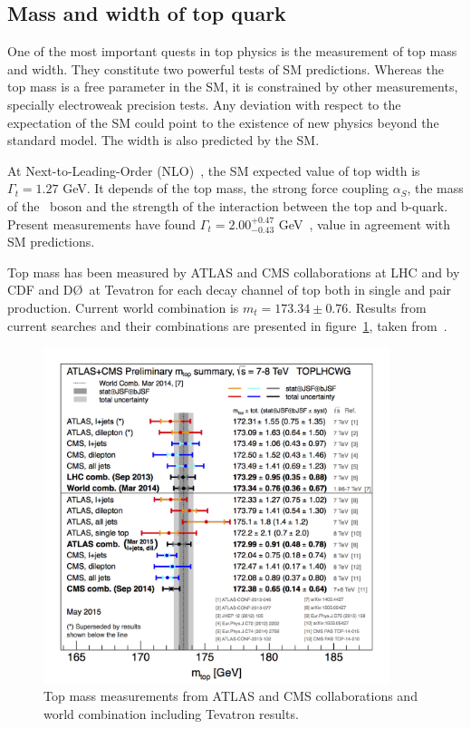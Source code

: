 \subsection{Mass and width of top quark}

One of the most important quests in top physics is the measurement of top mass and width. They constitute two powerful tests of SM predictions. Whereas the top mass is a free parameter in the SM, it is constrained by other measurements, specially electroweak precision tests. Any deviation with respect to the expectation of the SM could point to the existence of new physics beyond the standard model. The width is also predicted by the SM.%

At Next-to-Leading-Order (NLO)~\cite{Jezabek19891}, the SM expected value of top width is $\Gamma_{t}=1.27$ GeV. It depends of the top mass, the strong force coupling $\alpha_{S}$, the mass of the \W~boson and the strength of the interaction between the top and b-quark. Present measurements have found $\Gamma_{t}=2.00^{+0.47}_{-0.43}$ GeV~\cite{Abazov:2012vd}, value in agreement with SM predictions. 

Top mass has been measured by ATLAS and CMS collaborations at LHC and by CDF and D\O~at Tevatron for each decay channel of top both in single and pair production. Current world combination is $m_{t}=173.34\pm 0.76$. Results from current searches and their combinations are presented in figure~\ref{fig:TopMass}, taken from~\cite{TOPLHCWG}. 

\begin{figure}[!Hhtbp]
  \begin{center}
    \includegraphics[width=0.9\textwidth]{figs/LHC_topmass_May2015.png}
    \caption{Top mass measurements from ATLAS and CMS collaborations and world combination including Tevatron results.}
    \label{fig:TopMass}
  \end{center}
\end{figure}

